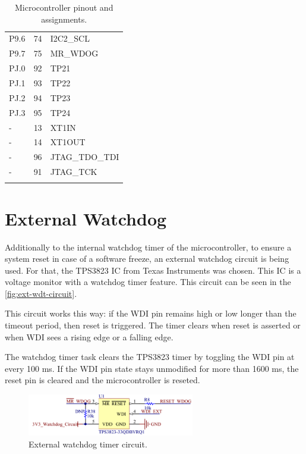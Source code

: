 \begin{longtable}{lcl}
    P9.6              & 74                  & I2C2\_SCL             \\
    P9.7              & 75                  & MR\_WDOG              \\
    \midrule
    PJ.0              & 92                  & TP21                  \\
    PJ.1              & 93                  & TP22                  \\
    PJ.2              & 94                  & TP23                  \\
    PJ.3              & 95                  & TP24                  \\
    \midrule
    -                 & 13                  & XT1IN                 \\
    -                 & 14                  & XT1OUT                \\
    -                 & 96                  & JTAG\_TDO\_TDI        \\
    -                 & 91                  & JTAG\_TCK             \\
    \bottomrule[1.5pt]
    \caption{Microcontroller pinout and assignments.}
    \label{tab:mcu-pinout}
\end{longtable}

\section{External Watchdog}

Additionally to the internal watchdog timer of the microcontroller, to ensure a system reset in case of a software freeze, an external watchdog circuit is being used. For that, the TPS3823 IC from Texas Instruments was chosen. This IC is a voltage monitor with a watchdog timer feature. This circuit can be seen in the \autoref{fig:ext-wdt-circuit}.

This circuit works this way: if the WDI pin remains high or low longer than the timeout period, then reset is triggered. The timer clears when reset is asserted or when WDI sees a rising edge or a falling edge.

The watchdog timer task clears the TPS3823 timer by toggling the WDI pin at every 100 ms. If the WDI pin state stays unmodified for more than 1600 ms, the reset pin is cleared and the microcontroller is reseted.

\begin{figure}[!ht]
    \begin{center}
        \includegraphics[width=0.65\textwidth]{figures/ext-watchdog-circuit.png}
        \caption{External watchdog timer circuit.}
        \label{fig:ext-wdt-circuit}
    \end{center}
\end{figure}

